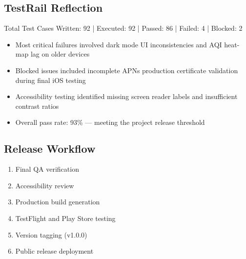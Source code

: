 \documentclass[12pt]{article}
\begin{document}
\subsection{TestRail Reflection}
Total Test Cases Written: 92  |  Executed: 92  |  Passed: 86  |  Failed: 4  |  Blocked: 2

\begin{itemize}
    \item Most critical failures involved dark mode UI inconsistencies and AQI heat-map lag on older devices
    \item Blocked issues included incomplete APNs production certificate validation during final iOS testing
    \item Accessibility testing identified missing screen reader labels and insufficient contrast ratios
    \item Overall pass rate: 93\% --- meeting the project release threshold
\end{itemize}

\subsection{Release Workflow}

\begin{enumerate}
    \item Final QA verification
    \item Accessibility review
    \item Production build generation
    \item TestFlight and Play Store testing
    \item Version tagging (v1.0.0)
    \item Public release deployment
\end{enumerate}
\end{document}
